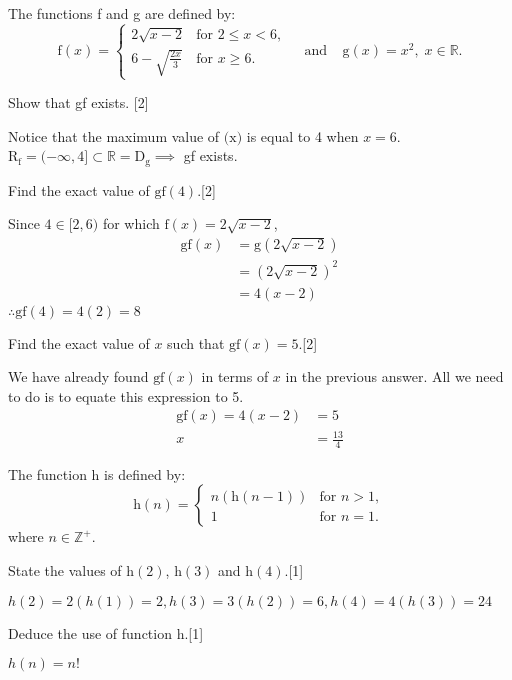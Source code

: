 \documentclass[12pt, a4 paper]{article}
\begin{document}
\begin{outline}[enumerate]
 \1 The functions f and g are defined by: \[\textrm{f}(x)=
  \begin{cases}
   2\sqrt{x-2}           & \textrm{for }2\leq x<6, \\
   6-\sqrt{\frac{2x}{3}} & \textrm{for }x\geq6.
  \end{cases}
  \;\;\;\;\textrm{and}\;\;\;\; \textrm{g}(x)=x^2,\;x\in \mathbb{R}.\]

 \2 Show that gf exists. \hfill[2]
 \begin{answer}
  Notice that the maximum value of $\textrm{(x)}$ is equal to 4 when $x=6$.\\
  R$_\textrm{f} = (-\infty,4] \subset \mathbb{R} = \textrm{D}_{\textrm{g}}\implies$ gf exists.
 \end{answer}
 \2 Find the exact value of $\textrm{gf}(4)$.\hfill[2]
 \begin{answer}
  Since $4\in [2,6)$ for which $\textrm{f}(x)=2\sqrt{x-2}$,
  \begin{align*}
   \textrm{gf}(x) & = \textrm{g}(2\sqrt{x-2}) \\
                  & = (2\sqrt{x-2})^2         \\
                  & = 4(x-2)
  \end{align*}
  $\therefore \textrm{gf}(4)=4(2)=8$
 \end{answer}
 \2 Find the exact value of $x$ such that $\textrm{gf}(x)=5$.\hfill[2]
 \begin{answer}
  We have already found $\textrm{gf}(x)$ in terms of $x$ in the previous answer. All we need to do is to equate this expression to 5.
  \begin{align*}
   \textrm{gf}(x) = 4(x-2) & = 5           \\
   x                       & =\frac{13}{4}
  \end{align*}
 \end{answer}
 \1 The function h is defined by: \[\textrm{h}(n)=
  \begin{cases}
   n(\textrm{h}(n-1)) & \textrm{for }n>1, \\
   1                  & \textrm{for }n=1.
  \end{cases}\]
 where $n \in \mathbb{Z}^+$.

 \2 State the values of $\textrm{h}(2)$, $\textrm{h}(3)$ and $\textrm{h}(4)$.\hfill[1]
 \begin{answer}
  $h(2)=2(h(1))=2, h(3)=3(h(2))=6, h(4)=4(h(3))=24$
 \end{answer}

 \2 Deduce the use of function h.\hfill[1]
 \begin{answer}
  $h(n)=n!$
 \end{answer}


\end{outline}
\end{document}
